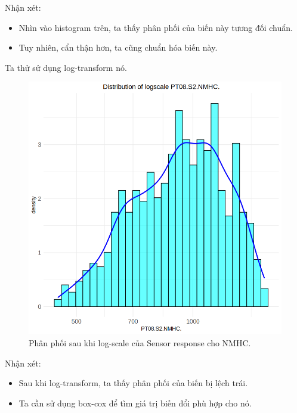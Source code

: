 Nhận xét:
\begin{itemize}
    \item Nhìn vào histogram trên, ta thấy phân phối của biến này tương đối chuẩn.
    \item Tuy nhiên, cẩn thận hơn, ta cũng chuẩn hóa biến này.
\end{itemize}

Ta thử sử dụng log-transform nó.

\begin{figure}[H]
    \centering
    \includegraphics[width=0.75\columnwidth]{air_figures/PT08.S2(NMHC)_logscale_distribution.png}
    \caption{Phân phối sau khi log-scale của Sensor response cho NMHC.}
    \label{fig:srnmhc_logscale_distribution}
\end{figure}
Nhận xét:
\begin{itemize}
    \item Sau khi log-transform, ta thấy phân phối của biến bị lệch trái. 
    \item Ta cần sử dụng box-cox để tìm giá trị biến đổi phù hợp cho nó.
\end{itemize}

